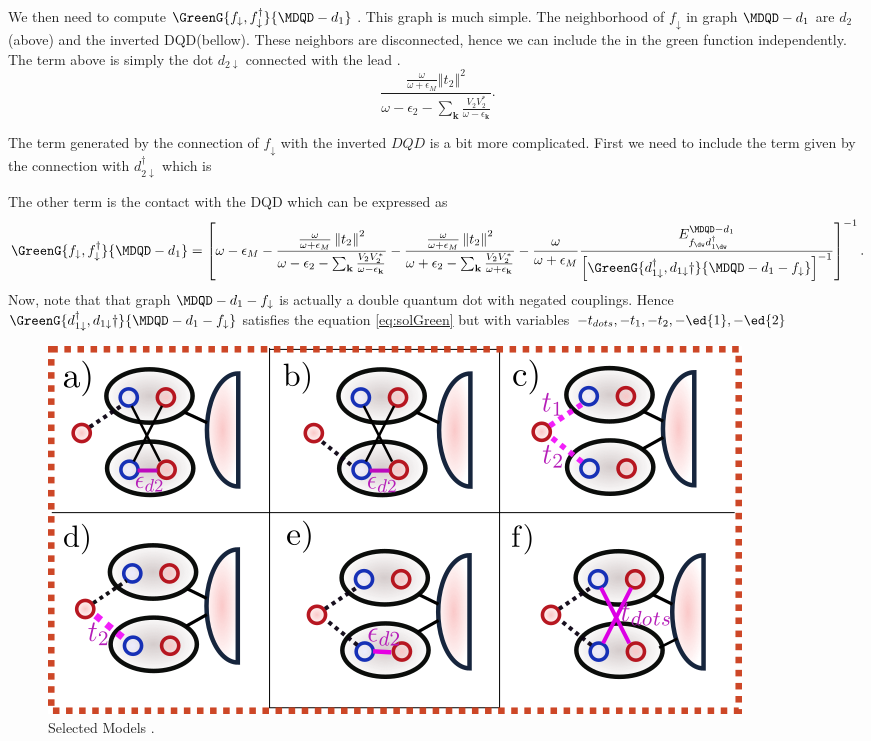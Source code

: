 We then need to compute $\GreenG{f_{\downarrow},f_{\downarrow}^{\dagger}}{\MDQD-d_{1}}$ . This graph is much simple. The neighborhood of  $f_{\downarrow}$ in graph ${\MDQD-d_{1}}$ are $d_2$ (above) and the inverted DQD(bellow). These neighbors are disconnected, hence we can include the in the green function independently. The term above is simply the dot $d_{2\downarrow}$ connected with the lead . 
\begin{equation}
    \frac{\frac{\omega}{\omega+\epsilon_{M}}\left\Vert t_{2}\right\Vert ^{2}}{\omega-\epsilon_{2}-\sum_{\mathbf{k}}\frac{V_{2}V_{2}^{*}}{\omega-\epsilon_{\mathbf{k}}}}.
\end{equation}

 
The term generated by the connection of $f_{\downarrow}$  with the inverted $DQD$ is a bit more complicated. First we need to include the term given by the connection with  $d_{2\downarrow}^\dagger$ which is 

The other term is the contact with the DQD which can be expressed as 
\begin{equation}
    \GreenG{f_{\downarrow},f_{\downarrow}^{\dagger}}{\MDQD-d_{1}}=\left[\omega-\epsilon_{M}-\frac{\frac{\omega}{\omega+\epsilon_{M}}\left\Vert t_{2}\right\Vert ^{2}}{\omega-\epsilon_{2}-\sum_{\mathbf{k}}\frac{V_{2}V_{2}^{*}}{\omega-\epsilon_{\mathbf{k}}}}-\frac{\frac{\omega}{\omega+\epsilon_{M}}\left\Vert t_{2}\right\Vert ^{2}}{\omega+\epsilon_{2}-\sum_{\mathbf{k}}\frac{V_{2}V_{2}^{*}}{\omega+\epsilon_{\mathbf{k}}}}-\frac{\omega}{\omega+\epsilon_{M}}\frac{E_{f_{\dw}d_{1\dw}^\dagger}^{\MDQD-d_1}}{\left[\GreenG{d_{1\downarrow}^{\dagger},d_{1\downarrow}{\dagger}}{\MDQD-d_{1}-f_{\downarrow}}\right]^{-1}}\right]^{-1}.
\end{equation}
Now, note that that graph $\MDQD-d_{1}-f_{\downarrow}$ is actually a double quantum dot with negated couplings. Hence  $\GreenG{d_{1\downarrow}^{\dagger},d_{1\downarrow}{\dagger}}{\MDQD-d_{1}-f_{\downarrow}}$  satisfies the equation \eqref{eq:solGreen} but with variables $-t_{dots}, -t_1 , -t_2, -\ed{1}  , -\ed{2}$


\begin{figure}[H]
\centering
\includegraphics[scale=0.4]{IMAGES/Graphs/Models.png}
\caption{\label{fig:Models}Selected Models . \protect{}} 
\end{figure}

